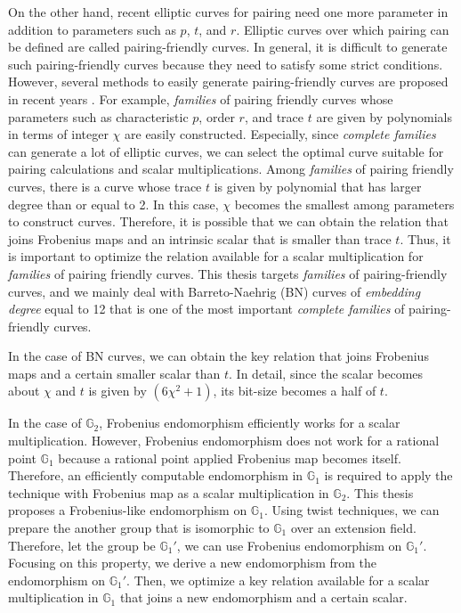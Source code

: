On the other hand, recent elliptic curves for pairing need one more parameter in addition to parameters such as $p$, $t$, and $r$.  
Elliptic curves over which pairing can be defined are called pairing-friendly curves.
In general, it is difficult to generate such pairing-friendly curves because they need to satisfy some strict conditions.
However, several methods to easily generate pairing-friendly curves are proposed in recent years \cite{JC:FreScoTes10}.
For example, {\it families} of pairing friendly curves whose parameters such as characteristic $p$, order $r$, and trace $t$ are given by polynomials in terms of integer $\chi$ are easily constructed.
Especially, since {\it complete families} can generate a lot of elliptic curves, we can select the optimal curve suitable for pairing calculations and scalar multiplications.
Among {\it families} of pairing friendly curves, there is a curve whose trace $t$ is given by polynomial that has larger degree than or equal to 2.
In this case, $\chi$ becomes the smallest among parameters to construct curves.
Therefore, it is possible that we can obtain the relation that joins Frobenius maps and an intrinsic scalar that is smaller than trace $t$.
Thus, it is important to optimize the relation available for a scalar multiplication for {\it families} of pairing friendly curves.
This thesis targets {\it families} of pairing-friendly curves, and we mainly deal with Barreto-Naehrig (BN) curves of {\it embedding degree} equal to 12 that is one of the most important {\it complete families} of pairing-friendly curves.

In the case of BN curves, we can obtain the key relation that joins Frobenius maps and a certain smaller scalar than $t$.
In detail, since the scalar becomes about $\chi$ and $t$ is given by $(6\chi^2+1)$, its bit-size becomes a half of $t$.
 
In the case of $\mathbb{G}_2$, Frobenius endomorphism efficiently works for a scalar multiplication.
However, Frobenius endomorphism does not work for a rational point $\mathbb{G}_1$ because a rational point applied Frobenius map becomes itself.
Therefore, an efficiently computable endomorphism in $\mathbb{G}_1$ is required to apply the technique with Frobenius map as a scalar multiplication in $\mathbb{G}_2$.
This thesis proposes a Frobenius-like endomorphism on $\mathbb{G}_1$.
Using twist techniques, we can prepare the another group that is isomorphic to $\mathbb{G}_1$ over an extension field. 
Therefore, let the group be $\mathbb{G}_1'$, we can use Frobenius endomorphism on $\mathbb{G}_1'$.
Focusing on this property, we derive a new endomorphism from the endomorphism on $\mathbb{G}_1'$.
Then, we optimize a key relation available for a scalar multiplication in $\mathbb{G}_1$ that joins a new endomorphism and a certain scalar.
  
